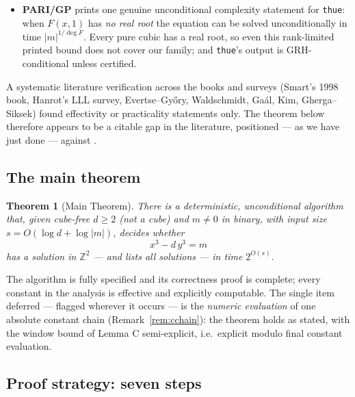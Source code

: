 \documentclass[11pt]{amsart}
\theoremstyle{plain}
\newtheorem{theorem}{Theorem}
\theoremstyle{remark}
\begin{document}
\begin{itemize}
{    \cite{Sma96}.} Smart's conclusion, quoted verbatim in Stroeker's
  review of the paper (Zbl 0896.11009): ``So although solving Thue
  equations is now considered trivial we seem to be a long way off
  from a `good' algorithm''. It is a per-method practical estimate ---
  not a rigorous worst-case decision theorem, and no bound of the
  shape of Theorem~\ref{thm:main} appears there.
\item \textbf{PARI/GP} \cite{PARI} prints one genuine unconditional
  complexity statement for \texttt{thue}: when $F(x,1)$ has \emph{no
  real root} the equation can be solved unconditionally in time
  $|m|^{1/\deg F}$. Every pure cubic has a real root, so even this
  rank-limited printed bound does not cover our family; and
  \texttt{thue}'s output is GRH-conditional unless certified.
\end{itemize}

A systematic literature verification across the books and surveys
(Smart's 1998 book, Hanrot's LLL survey, Evertse--Gy\H{o}ry,
Waldschmidt, Ga\'al, Kim, Gherga--Siksek) found effectivity or
practicality statements only.
The theorem below therefore appears to be a citable gap in the
literature, positioned --- as we have just done --- against
\cite{Sma96}.

\subsection{The main theorem}\label{sec:mainthm}

\begin{theorem}[Main Theorem]\label{thm:main}
There is a deterministic, unconditional algorithm that, given cube-free
$d \ge 2$ (not a cube) and $m \ne 0$ in binary, with input size
$s = O(\log d + \log|m|)$, decides whether
\[
x^3 - d\,y^3 = m
\]
has a solution in $\mathbb{Z}^2$ --- and lists all solutions --- in
time $2^{O(s)}$.
\end{theorem}

The algorithm is fully specified and its correctness proof is complete;
every constant in the analysis is effective and explicitly computable.
The single item deferred --- flagged wherever it occurs --- is the
\emph{numeric evaluation} of one absolute constant chain
(Remark~\ref{rem:cchain}): the theorem holds as stated, with the window
bound of Lemma C semi-explicit, i.e.\ explicit modulo final constant
evaluation.

\subsection{Proof strategy: seven steps}\label{sec:strategy}
\end{document}
